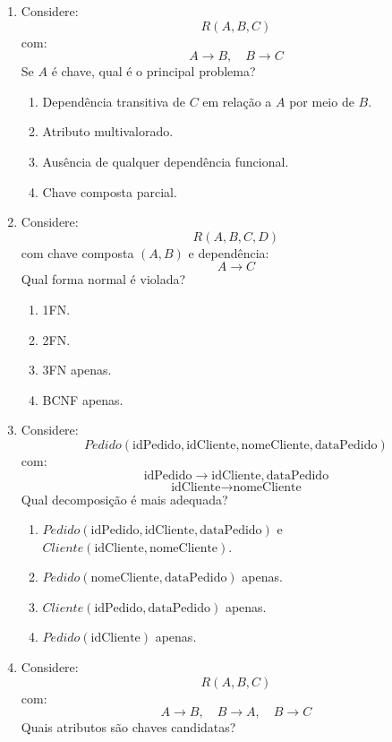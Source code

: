\documentclass[12pt,a4paper]{article}
\begin{document}
\begin{enumerate}[resume,label=\textbf{Q\arabic*.}]

\item Considere:
\[
R(A,B,C)
\]
com:
\[
A \rightarrow B,\quad B \rightarrow C
\]
Se $A$ é chave, qual é o principal problema?

\begin{enumerate}[label=\alph*)]
    \item Dependência transitiva de $C$ em relação a $A$ por meio de $B$.
    \item Atributo multivalorado.
    \item Ausência de qualquer dependência funcional.
    \item Chave composta parcial.
\end{enumerate}

\item Considere:
\[
R(A,B,C,D)
\]
com chave composta $(A,B)$ e dependência:
\[
A \rightarrow C
\]
Qual forma normal é violada?

\begin{enumerate}[label=\alph*)]
    \item 1FN.
    \item 2FN.
    \item 3FN apenas.
    \item BCNF apenas.
\end{enumerate}

\item Considere:
\[
Pedido(\text{idPedido}, \text{idCliente}, \text{nomeCliente}, \text{dataPedido})
\]
com:
\[
\text{idPedido} \rightarrow \text{idCliente}, \text{dataPedido}
\]
\[
\text{idCliente} \rightarrow \text{nomeCliente}
\]
Qual decomposição é mais adequada?

\begin{enumerate}[label=\alph*)]
    \item $Pedido(\text{idPedido}, \text{idCliente}, \text{dataPedido})$ e $Cliente(\text{idCliente}, \text{nomeCliente})$.
    \item $Pedido(\text{nomeCliente}, \text{dataPedido})$ apenas.
    \item $Cliente(\text{idPedido}, \text{dataPedido})$ apenas.
    \item $Pedido(\text{idCliente})$ apenas.
\end{enumerate}

\item Considere:
\[
R(A,B,C)
\]
com:
\[
A \rightarrow B,\quad B \rightarrow A,\quad B \rightarrow C
\]
Quais atributos são chaves candidatas?


\end{enumerate}
\end{document}
